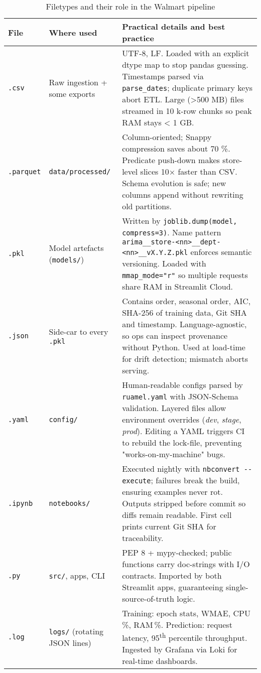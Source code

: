 \begin{table}[H]
	\centering\footnotesize
	\begin{tabular}{|l|p{3.5cm}|p{8.4cm}|}
		\hline
		\textbf{File} & \textbf{Where used} & \textbf{Practical details and best practice} \\ \hline\hline
		\texttt{.csv} & Raw ingestion + some exports &
		UTF-8, LF.  Loaded with an explicit dtype map to stop pandas guessing.  
		Timestamps parsed via \verb|parse_dates|; duplicate primary keys abort ETL.  
		Large (>500 MB) files streamed in 10 k-row chunks so peak RAM stays < 1 GB. \\ \hline
		\texttt{.parquet} & \verb|data/processed/| &
		Column-oriented; Snappy compression saves about 70 \%.  
		Predicate push-down makes store-level slices 10× faster than CSV.  
		Schema evolution is safe; new columns append without rewriting old partitions. \\ \hline
		\texttt{.pkl} & Model artefacts (\texttt{models/}) &
		Written by \verb|joblib.dump(model, compress=3)|.  
		Name pattern \texttt{arima\_\_store-<nn>\_\_dept-<nn>\_\_vX.Y.Z.pkl} enforces semantic versioning.  
		Loaded with \verb|mmap_mode="r"| so multiple requests share RAM in Streamlit Cloud. \\ \hline
		\texttt{.json} & Side-car to every \texttt{.pkl} &
		Contains order, seasonal order, AIC, SHA-256 of training data, Git SHA and timestamp.  
		Language-agnostic, so ops can inspect provenance without Python.  
		Used at load-time for drift detection; mismatch aborts serving. \\ \hline
		\texttt{.yaml} & \texttt{config/} &
		Human-readable configs parsed by \verb|ruamel.yaml| with JSON-Schema validation.  
		Layered files allow environment overrides (\textit{dev}, \textit{stage}, \textit{prod}).  
		Editing a YAML triggers CI to rebuild the lock-file, preventing "works-on-my-machine" bugs. \\ \hline
		\texttt{.ipynb} & \texttt{notebooks/} &
		Executed nightly with \verb|nbconvert --execute|; failures break the build, ensuring examples never rot.  
		Outputs stripped before commit so diffs remain readable.  First cell prints current Git SHA for traceability. \\ \hline
		\texttt{.py} & \texttt{src/}, apps, CLI &
		PEP 8 + mypy-checked; public functions carry doc-strings with I/O contracts.  
		Imported by both Streamlit apps, guaranteeing single-source-of-truth logic. \\ \hline
		\texttt{.log} & \texttt{logs/} (rotating JSON lines) &
		Training: epoch stats, WMAE, CPU\,\%, RAM\,\%.  
		Prediction: request latency, 95\textsuperscript{th} percentile throughput.  
		Ingested by Grafana via Loki for real-time dashboards. \\ \hline
	\end{tabular}
	\caption{Filetypes and their role in the Walmart pipeline}
	\label{tab:filetypes}
\end{table}

